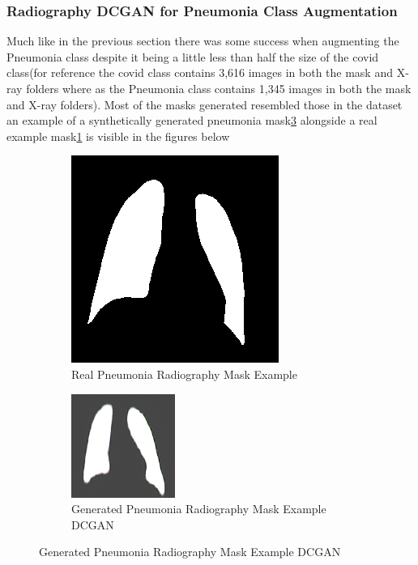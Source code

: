\subsubsection{Radiography DCGAN for Pneumonia Class Augmentation}
Much like in the previous section there was some success when augmenting the Pneumonia class despite it being a little less than half the size of the covid class(for reference the covid class contains 3,616 images in both the mask and X-ray folders where as the Pneumonia class contains 1,345 images in both the mask and X-ray folders).  Most of the masks generated resembled those in the dataset an example of a synthetically generated pneumonia mask\ref{fig:Synthetically Generated Pneumonia Radiography Mask(DCGAN)} alongside a real example mask\ref{fig:Real Pneumonia Radiography Mask Example} is visible in the figures below
 \begin{figure}[H]
    \centering
    \begin{subfigure}{.4\textwidth}
    \centering
      \includegraphics[width=.4\linewidth,keepaspectratio]{Images/ExampleOfPneumoniaMaskRadiographyCOVID19.png}
      \caption{Real Pneumonia Radiography Mask Example}
      \label{fig:Real Pneumonia Radiography Mask Example}
    \end{subfigure}\hfill%
    \begin{subfigure}{.4\textwidth}
    \centering
      \includegraphics[width=.4\linewidth,keepaspectratio]{Images/ExampleOfSyntheticallyGeneratedMaskPneumoniaCOVID19RadiographyDCGAN.png}
      \caption{Generated Pneumonia Radiography Mask Example DCGAN}
      \label{fig:Synthetically Generated Pneumonia Radiography Mask(DCGAN)}
    \end{subfigure}\hfill%
\end{figure}
